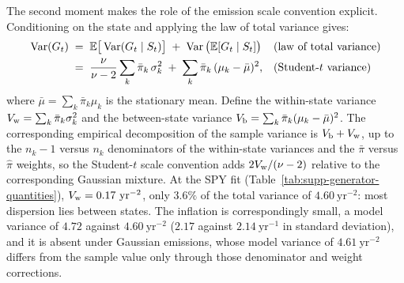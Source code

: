 The second moment makes the role of the emission scale convention
explicit. Conditioning on the state and applying the law of total
variance gives:
\begin{align}
  \operatorname{Var}(G_t)
   &\;=\; \mathbb{E}\big[\operatorname{Var}(G_t \mid S_t)\big]
     \;+\; \operatorname{Var}\big(\mathbb{E}[G_t \mid S_t]\big)
     && \text{(law of total variance)} \notag \\
   &\;=\; \frac{\nu}{\nu - 2} \sum_k \bar\pi_k\, \sigma_k^2
     \;+\; \sum_k \bar\pi_k\, (\mu_k - \bar\mu)^2,
     && \text{(Student-$t$ variance)}
  \label{eq:supp-variance}
\end{align}
where $\bar\mu = \sum_k \bar\pi_k \mu_k$ is the stationary mean.
Define the within-state variance $V_{\rm w} = \sum_k \bar\pi_k
\sigma_k^2$ and the between-state variance $V_{\rm b} = \sum_k
\bar\pi_k (\mu_k - \bar\mu)^2$. The corresponding empirical
decomposition of the sample variance is $V_{\rm b} + V_{\rm w}$, up to
the $n_k - 1$ versus $n_k$ denominators of the within-state variances
and the $\bar\pi$ versus $\hat\pi$ weights, so the Student-$t$ scale convention adds
$2 V_{\rm w} / (\nu - 2)$ relative to the corresponding Gaussian mixture. At the SPY fit
(Table~\ref{tab:supp-generator-quantities}),
$V_{\rm w} = 0.17~\mathrm{yr}^{-2}$, only $3.6\%$ of the total
variance of $4.60~\mathrm{yr}^{-2}$: most dispersion lies between states. The inflation is correspondingly small, a model variance of
$4.72$ against $4.60~\mathrm{yr}^{-2}$ ($2.17$ against
$2.14~\mathrm{yr}^{-1}$ in standard deviation), and it is absent under
Gaussian emissions, whose model variance of $4.61~\mathrm{yr}^{-2}$
differs from the sample value only through those denominator and
weight corrections.

